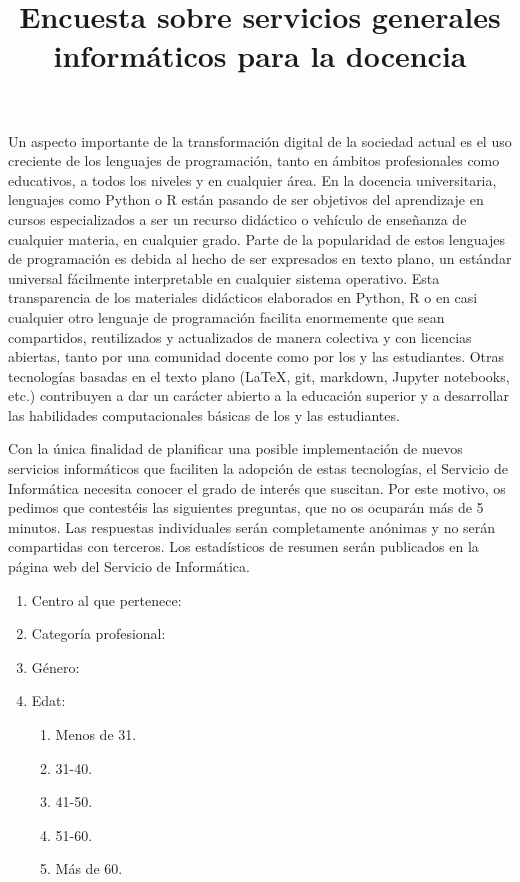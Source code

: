 \documentclass[a4paper,12pt]{article}
\title{Encuesta sobre servicios generales informáticos para la docencia}
\begin{document}
\maketitle
Un aspecto importante de la transformación digital de la sociedad actual es el uso creciente
de los lenguajes de programación, tanto en ámbitos profesionales como educativos, a todos
los niveles y en cualquier área. En la docencia universitaria, lenguajes como Python o R
están pasando de ser objetivos del aprendizaje en cursos especializados a ser un recurso
didáctico o vehículo de enseñanza de cualquier materia, en cualquier grado. Parte de la
popularidad de estos lenguajes de programación es debida al hecho de ser expresados en
texto plano, un estándar universal fácilmente interpretable en cualquier sistema operativo.
Esta transparencia de los materiales didácticos elaborados en Python, R o en casi cualquier
otro lenguaje de programación facilita enormemente que sean compartidos, reutilizados y
actualizados de manera colectiva y con licencias abiertas, tanto por una comunidad docente
como por los y las estudiantes. Otras tecnologías basadas en el texto plano (\LaTeX, git,
markdown, Jupyter notebooks, etc.) contribuyen a dar un carácter abierto a la educación
superior y a desarrollar las habilidades computacionales básicas de los y las estudiantes.

Con la única finalidad de planificar una posible implementación de nuevos servicios
informáticos que faciliten la adopción de estas tecnologías, el Servicio de Informática
necesita conocer el grado de interés que suscitan. Por este motivo, os pedimos que
contestéis las siguientes preguntas, que no os ocuparán más de 5 minutos. Las respuestas
individuales serán completamente anónimas y no serán compartidas con terceros. Los estadísticos
de resumen serán publicados en la página web del Servicio de Informática.

\begin{enumerate}
\item Centro al que pertenece:
\item Categoría profesional:
\item Género:
\item Edat:
   \begin{enumerate}
   \item Menos de 31.
   \item 31-40.
   \item 41-50.
   \item 51-60.
   \item Más de 60.
   \end{enumerate}
\end{enumerate}
\end{document}
